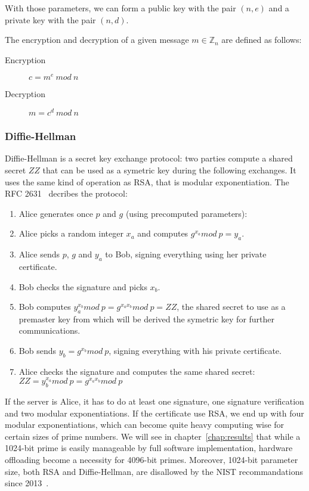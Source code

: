 With those parameters, we can form a public key with the pair $(n, e)$ and a private key with the pair $(n, d)$.

The encryption and decryption of a given message $m \in \mathds{Z}_n$ are defined as follows:
\begin{description}
	\item[Encryption] $c = m^e\ mod\ n$
	\item[Decryption] $m = c^d\ mod\ n$
\end{description}




\subsubsection{Diffie-Hellman}
Diffie-Hellman is a secret key exchange protocol: two parties compute a shared secret $ZZ$ that can be used as a symetric key during the following exchanges.
It uses the same kind of operation as RSA, that is modular exponentiation.
The RFC 2631~\cite{rfc2631} decribes the protocol:

\begin{enumerate}
	\item Alice generates once $p$ and $g$ (using precomputed parameters):
	\begin{description}[nosep]
		\item[p] large prime number
		\item[g] a generator of $\mathds{Z}_p^*$
	\end{description}
	\item Alice picks a random integer $x_a$ and computes $g^{x_a} mod\ p = y_a$.
	\item Alice sends $p$, $g$ and $y_a$ to Bob, signing everything using her private certificate.
	\item Bob checks the signature and picks $x_b$.
	\item Bob computes $y_a^{x_b} mod\ p = g^{x_a x_b} mod\ p = ZZ$, the shared secret to use as a premaster key from which will be derived the symetric key for further communications.
	\item Bob sends $y_b = g^{x_b} mod\ p$, signing everything with his private certificate.
	\item Alice checks the signature and computes the same shared secret: $ZZ = y_b^{x_a} mod\ p = g^{x_a x_b} mod\ p$
\end{enumerate}

If the server is Alice, it has to do at least one signature, one signature verification and two modular exponentiations.
If the certificate use RSA, we end up with four modular exponentiations, which can become quite heavy computing wise for certain sizes of prime numbers.
We will see in chapter~\ref{chap:results} that while a 1024-bit prime is easily manageable by full software implementation, hardware offloading become a necessity for 4096-bit primes.
Moreover, 1024-bit parameter size, both RSA and Diffie-Hellman, are disallowed by the NIST recommandations since 2013~\cite{nist-sp800-131A}.

